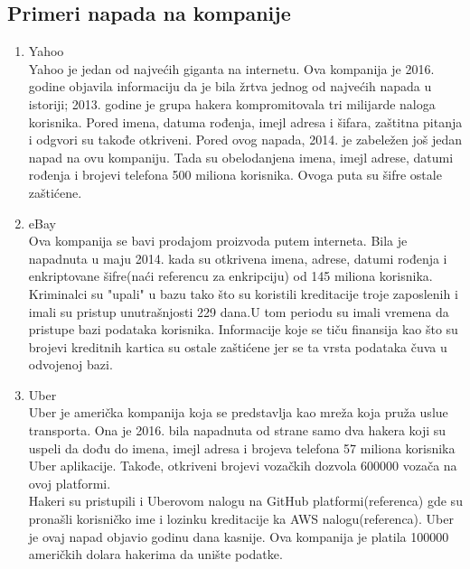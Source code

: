 \documentclass[a4paper]{article}
\theoremstyle{break}
\begin{document}
{\begin{enumerate}
\end{enumerate}


\subsection{Primeri napada na kompanije}
\label{subsec:primeri_napada_kompanije}


\begin{enumerate}
\item Yahoo
\\Yahoo je jedan od najvećih giganta na internetu. Ova kompanija je 2016. godine objavila informaciju da je bila žrtva jednog od najvećih napada u istoriji; 2013. godine je grupa hakera kompromitovala tri milijarde naloga korisnika. Pored imena, datuma rođenja, imejl adresa i šifara, zaštitna pitanja i odgvori su takođe otkriveni. 
Pored ovog napada, 2014. je zabeležen još jedan napad na ovu kompaniju. Tada su obelodanjena imena, imejl adrese, datumi rođenja i brojevi telefona 500 miliona korisnika. Ovoga puta su šifre ostale zaštićene.\\ 
\item eBay
\\Ova kompanija se bavi prodajom proizvoda putem interneta. Bila je napadnuta u maju 2014. kada su otkrivena imena, adrese, datumi rođenja i enkriptovane šifre(naći referencu za enkripciju) od 145 miliona korisnika. Kriminalci su "upali" u bazu tako što su koristili kreditacije troje zaposlenih i imali su pristup unutrašnjosti 229 dana.U tom periodu su imali vremena da pristupe bazi podataka korisnika. Informacije koje se tiču finansija kao što su brojevi kreditnih kartica su ostale zaštićene jer se ta vrsta podataka čuva u odvojenoj bazi.\\
\item Uber
\\Uber je američka kompanija koja se predstavlja kao mreža koja pruža uslue transporta. Ona je 2016. bila napadnuta od strane samo dva hakera koji su uspeli da dođu do imena, imejl adresa i brojeva telefona 57 miliona korisnika Uber aplikacije. Takođe, otkriveni brojevi vozačkih dozvola 600000 vozača na ovoj platformi.\\Hakeri su pristupili i Uberovom nalogu na GitHub platformi(referenca) gde su pronašli korisničko ime i lozinku kreditacije ka AWS nalogu(referenca). 
Uber je ovaj napad objavio godinu dana kasnije. Ova kompanija je platila 100000 američkih dolara hakerima da unište podatke.  
\end{enumerate}


}
\end{document}
